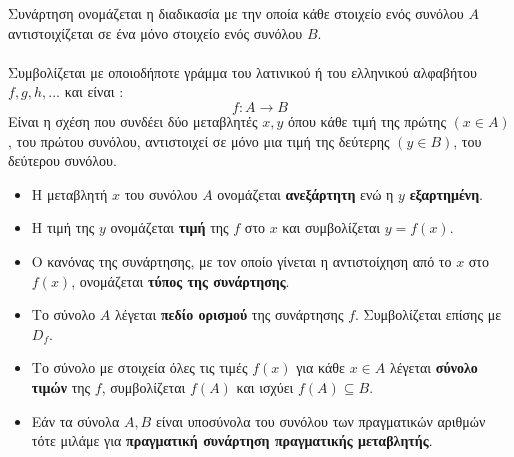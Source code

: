 Συνάρτηση ονομάζεται η διαδικασία με την οποία κάθε στοιχείο ενός συνόλου $ A $ αντιστοιχίζεται σε ένα μόνο στοιχείο ενός συνόλου $ B $.\\\\
Συμβολίζεται με οποιοδήποτε γράμμα του λατινικού ή του ελληνικού αλφαβήτου $ f, g, h,\ldots $ και είναι : \[ f:A\rightarrow B \]
Είναι η σχέση που συνδέει δύο μεταβλητές $ x,y $ όπου κάθε τιμή της πρώτης $ (x\in A) $, του πρώτου συνόλου, αντιστοιχεί σε μόνο μια τιμή της δεύτερης $ (y\in B) $, του δεύτερου συνόλου.\vspace{-3mm}
\begin{center}
\begin{figure}[h]
\centering
{}
\end{figure}
\end{center}
\vspace{-1.1cm}
\begin{itemize}[itemsep=0mm]
\item Η μεταβλητή $ x $ του συνόλου $ A $ ονομάζεται \textbf{ανεξάρτητη} ενώ η $ y $ \textbf{εξαρτημένη}.
\item Η τιμή της $ y $ ονομάζεται \textbf{τιμή} της $ f $ στο $ x $ και συμβολίζεται $ y=f(x) $.
\item Ο κανόνας της συνάρτησης, με τον οποίο γίνεται η αντιστοίχηση από το $ x $  στο $ f(x) $, ονομάζεται \textbf{τύπος της συνάρτησης}.
\item Το σύνολο $ A $ λέγεται \textbf{πεδίο ορισμού} της συνάρτησης $ f $. Συμβολίζεται επίσης με $ D_f $. 
\item Το σύνολο με στοιχεία όλες τις τιμές $ f(x) $ για κάθε $ x\in A $ λέγεται \textbf{σύνολο τιμών} της $ f $, συμβολίζεται $ f\left(A\right) $ και ισχύει $ f\left(A\right)\subseteq B $.
\item Εάν τα σύνολα $ A,B $ είναι υποσύνολα του συνόλου των πραγματικών αριθμών τότε μιλάμε για \textbf{πραγματική συνάρτηση πραγματικής μεταβλητής}.
\end{itemize}
